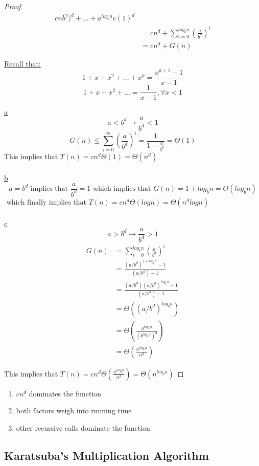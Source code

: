\documentclass[12pt]{article}
\begin{document}
\begin{proof}
\begin{align*}
c{n}{b^2})^d + ... + a^{log_b n} c (1)^d\\
	&= cn^d + \sum^{log_b n}_{i=0} (\frac{a}{b^d})^i\\
	&= cn^d + G(n)
\end{align*}

\underline{Recall that:} $$1+x+x^2 + ... + x^k = \frac{x^{k+1}-1}{x-1}$$
$$1+x+x^2 + ... = \frac{1}{x-1}, \forall x<1$$

\underline{a} $$a<b^d \longrightarrow \frac{a}{b^d} < 1$$
$$G(n) \leq \sum^\infty_{i=0} (\frac{a}{b^d})^i = \frac{1}{1-\frac{a}{b^d}} = \Theta (1)$$
This implies that $T(n) = cn^d\Theta (1) = \Theta (n^d)$
\\
\\
\underline{b}
$$a = b^d \text{ implies that } \frac{a}{b^d} = 1 \text{ which implies that } G(n) = 1+ log_b n = \Theta (log_b n)$$
$\text{ which finally implies that } T(n) = cn^d\Theta (logn) = \Theta (n^d logn)$\\
\\
\underline{c}
$$a > b^d \longrightarrow \frac{a}{b^d} > 1$$
\begin{align*}
	G(n) &= \sum^{log_b n}_{i=0} (\frac{a}{b^d})^i\\
	&= \frac{(a/b^d)^{1+log_b n}-1}{(a/b^d)-1}\\
	&= \frac{(a/b^d)(a/b^d)^{log_b n}-1}{(a/b^d)-1}\\
	&= \Theta ((a/b^d)^{log_b n})\\
	&= \Theta (\frac{a^{log_b n}}{(b^{log_b n})^d})\\
	&= \Theta (\frac{n^{log_b a}}{n^d})
\end{align*}

This implies that $T(n) = cn^d \Theta (\frac{n^{log_b a}}{n^d}) = \Theta (n^{log_b a})$

\end{proof}

\begin{tcolorbox}[title=Intuition]
	\begin{enumerate}[label=\alph*]
	\item{$cn^d$ dominates the function}
	\item{both factors weigh into running time}
	\item{other recursive calls dominate the function}
\end{enumerate}
\end{tcolorbox}

\subsection{Karatsuba's Multiplication Algorithm}
\end{document}
